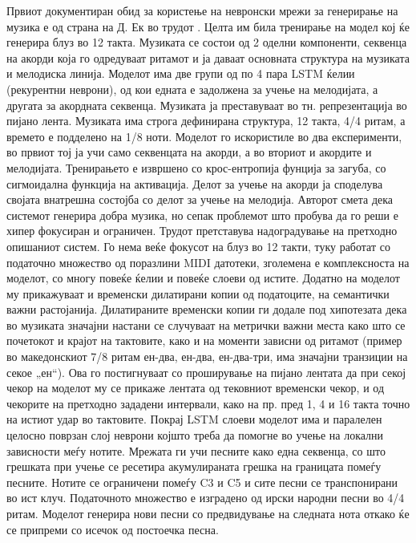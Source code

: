 Првиот документиран обид за користење на невронски мрежи за генерирање на музика е од страна на Д. Ек во трудот \cite{Eck2002}. Целта им била тренирање на модел кој ќе генерира блуз во 12 такта. Музиката се состои од 2 оделни компоненти, секвенца на акорди која го одредуваат ритамот и ја даваат основната структура на музиката и мелодиска линија. Моделот има две групи од по 4 пара LSTM ќелии (рекурентни неврони), од кои едната е задолжена за учење на мелодијата, а другата за акордната секвенца. Музиката ја преставуваат во тн. репрезентација во пијано лента. Музиката има строга дефинирана структура, 12 такта, 4/4 ритам, а времето е подделено на 1/8 ноти. Моделот го искористиле во два експерименти, во првиот тој ја учи само секвенцата на акорди, а во вториот и акордите и мелодијата. Тренирањето е извршено со крос-ентропија фунција за загуба, со сигмоидална функција на активација. Делот за учење на акорди ја споделува својата внатрешна состојба со делот за учење на мелодија. Авторот смета дека системот генерира добра музика, но сепак проблемот што пробува да го реши е хипер фокусиран и ограничен. Трудот \cite{Eck2008} претставува надоградување на претходно опишаниот систем. Го нема веќе фокусот на блуз во 12 такти, туку работат со податочно множество од поразлини MIDI датотеки, зголемена е комплексноста на моделот, со многу повеќе ќелии и повеќе слоеви од истите. Додатно на моделот му прикажуваат и временски дилатирани копии од податоците, на семантички важни растојанија. Дилатираните временски копии ги додале под хипотезата дека во музиката значајни настани се случуваат на метрички важни места како што се почетокот и крајот на тактовите, како и на моменти зависни од ритамот (пример во македонскиот 7/8 ритам ен-два, ен-два, ен-два-три, има значајни транзиции на секое „ен“). Ова го постигнуваат со проширување на пијано лентата да при секој чекор на моделот му се прикаже лентата од тековниот временски чекор, и од чекорите на претходно зададени интервали, како на пр. пред 1, 4 и 16 такта точно на истиот удар во тактовите. Покрај LSTM слоеви моделот има и паралелен целосно поврзан слој неврони којшто треба да помогне во учење на локални зависности меѓу нотите. Мрежата ги учи песните како една секвенца, со што грешката при учење се ресетира акумулираната грешка на границата помеѓу песните. Нотите се ограничени помеѓу C3 и C5 и сите песни се транспонирани во ист клуч. Податочното множество е изградено од  ирски народни песни во 4/4 ритам. Моделот генерира нови песни со предвидување на следната нота откако ќе се припреми со исечок од постоечка песна.


